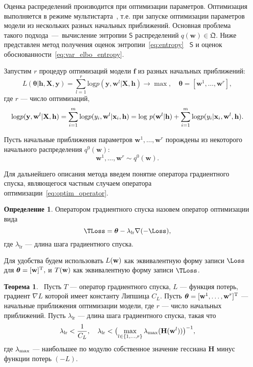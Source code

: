\documentclass[11pt, a5paper]{dissert}
\theoremstyle{definition}
\newtheorem{theorem}{Теорема}
\newtheorem{defin}{Определение}
\begin{document}
{Оценка распределений производится при оптимизации параметров. Оптимизация выполняется в режиме мультистарта~\cite{multi}, т.е. при запуске оптимизации параметров модели из нескольких разных начальных приближений. Основная проблема такого подхода~---~вычисление энтропии $\mathsf{S}$ распределений $q(\mathbf{w}) \in \mathfrak{Q}$. Ниже представлен метод получения оценок энтропии~\eqref{eq:entropy} ~$\mathsf{S}$ и оценок обоснованности~\eqref{eq:var_elbo_entropy}.

Запустим $r$ процедур оптимизаций модели $\mathbf{f}$ из разных начальных приближений:
\[
	L( \boldsymbol{\theta}| \mathbf{h}, \mathbf{X}, \mathbf{y}) = \sum_{l=1}^r \text{log}p(\mathbf{y}, \mathbf{w}^l|\mathbf{X}, \mathbf{h})  \to \max, \quad \boldsymbol{\theta} = [\mathbf{w}^1, \dots, \mathbf{w}^r],
\] 
где $r$ --- число оптимизаций,
\begin{equation}
\label{eq:loss_func}
\text{log}p(\mathbf{y}, \mathbf{w}^l|\mathbf{X}, \mathbf{h}) = \sum_{i=1}^m \textnormal{log}p({y}_i, \mathbf{w}^l |\mathbf{x}_i, \mathbf{h}) = \textnormal{log}~p(\mathbf{w}^l|\mathbf{h}) + \sum_{i=1}^m \textnormal{log}p({y}_i |\mathbf{x}_i, \mathbf{w}^l, \mathbf{h}).
\end{equation}

Пусть начальные приближения параметров $\mathbf{w}^1, \dots, \mathbf{w}^r$ порождены из некоторого начального распределения $q^0(\mathbf{w})$:
\[ 
	\mathbf{w}^1, \dots, \mathbf{w}^r \sim q^0(\mathbf{w}). 
\]


Для дальнейшего описания метода введем понятие оператора градиентного спуска, являющегося частным случаем оператора оптимизации~\eqref{eq:optim_operator}.
\begin{defin}
Оператором градиентного спуска назовем оператор оптимизации вида
\begin{equation}
\label{eq:sgd}
	\TLoss  = \boldsymbol{\theta} - \lambda_{\text{lr}} \nabla (-\Loss), 
\end{equation}
где  $\lambda_{\text{lr}}$ --- длина шага градиентного спуска.
\end{defin}
Для удобства будем использовать $L(\mathbf{w})$ как эквивалентную форму записи $\Loss$ для $\boldsymbol{\theta} = [\mathbf{w}]^\text{T},$ и $T(\mathbf{w})$  как эквивалентную форму записи $\TLoss$. 

\begin{theorem}~Пусть $T$ --- оператор градиентного спуска,
 $L$ --- функция потерь, градиент $\nabla L$ которой имеет константу Липшица $C_L$.  Пусть $\boldsymbol{\theta} = [\mathbf{w}^1,\dots,\mathbf{w}^r]^\text{T}$ ---  начальные приближения оптимизации модели, где $r$ --- число начальных приближений. Пусть $\lambda_{\text{lr}}$ --- длина шага градиентного спуска, такая что
\begin{equation}
\label{eq:ineq}
\lambda_{\text{lr}}<\frac{1}{C_L}, \quad \lambda_{\text{lr}} < \bigl(\max_{l \in \{1,\dots,r\}}\lambda_\textnormal{max} (\mathbf{H}(\mathbf{w}^l))\bigr)^{-1}, 
\end{equation}
где $\lambda_\textnormal{max}$ --- наибольшее по модулю собственное значение гессиана  $\mathbf{H}$ минус функции потерь $(-L)$.


\end{theorem}}
\end{document}
